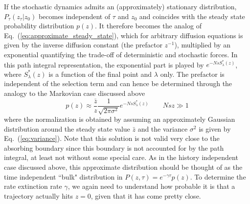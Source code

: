 \documentclass[rmp,preprint]{revtex4}
\newcommand{\EQ}[1]{Eq.~(\ref{eq:#1})}
\newcommand{\xz}{z}
\newcommand{\xzs}{\bar{\xz}}
\newcommand{\rate}{\gamma}
\newcommand{\tx}[1]{\xz_{#1}}
\newcommand{\Smin}{S^*}
\begin{document}
If the stochastic dynamics admits an (approximately) stationary distribution,  $P_{\tau}(\tx{\tau} |\tx{0})$ becomes independent of $\tau$ and $\tx{0}$ and coincides with the steady state probability distribution $p(\xz)$. It therefore becomes the analog of \EQ{approximate_steady_state}, which for arbitrary diffusion equations is given by the inverse diffusion constant (the prefactor $\xz^{-1}$), multiplied by an exponential quantifying the trade-off of deterministic and stochastic forces. In this path integral representation, the exponential part is played by $e^{-Ns \Smin_{\lambda}(\xz)}$, where $\Smin_{\lambda}(\xz)$ is a function of the final point and $\lambda$ only. The prefactor is independent of the selection term and can hence be determined through the analogy to the Markovian case discussed above
\begin{equation}
\label{eq:bulk}
p(\xz)\approx \frac{\xzs}{\xz}\frac{1}{\sqrt{2\pi \sigma^2}}e^{-Ns\Smin_{\lambda}(\xz)} \quad\quad Ns \xz \gg 1
\end{equation}
where the normalization is obtained by assuming an approximately Gaussian distribution around the steady state value $\xzs$ and the variance $\sigma^2$ is given by \EQ{variance}. Note that this solution is not valid very close to the absorbing boundary since this boundary is not accounted for by the path integral, at least not without some special care. As in the history independent case discussed above, this approximate distribution should be thought of as the time independent  ``bulk" distribution in $P(\xz,\tau) = e^{-\rate\tau}p(\xz)$. To determine the rate extinction rate $\rate$, we again need to understand how probable it is that a trajectory actually hits $\xz=0$, given that it has come pretty close. 
\end{document}

